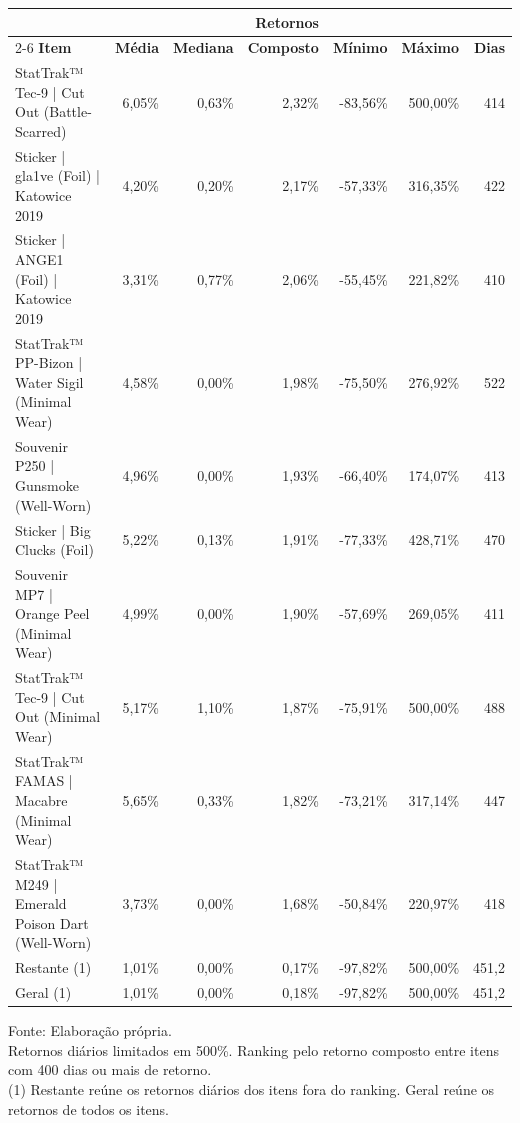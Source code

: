 \begingroup
\setlength{}
\setlength{}
\fontsize{8.0pt}{9.6pt}\selectfont

\setlength{\LTpost}{0mm}
\begin{longtable}{@{\extracolsep{\fill}}lrrrrrr}

\toprule
 & \multicolumn{5}{c}{\textbf{Retornos}} &  \\ 
\cmidrule(lr){2-6}
\textbf{Item} & \textbf{Média} & \textbf{Mediana} & \textbf{Composto} & \textbf{Mínimo} & \textbf{Máximo} & \textbf{Dias} \\ 
\midrule\addlinespace[2.5pt]
StatTrak™ Tec-9 | Cut Out (Battle-Scarred) & 6,05\% & 0,63\% & 2,32\% & -83,56\% & 500,00\% & 414 \\
Sticker | gla1ve (Foil) | Katowice 2019 & 4,20\% & 0,20\% & 2,17\% & -57,33\% & 316,35\% & 422 \\
Sticker | ANGE1 (Foil) | Katowice 2019 & 3,31\% & 0,77\% & 2,06\% & -55,45\% & 221,82\% & 410 \\
StatTrak™ PP-Bizon | Water Sigil (Minimal Wear) & 4,58\% & 0,00\% & 1,98\% & -75,50\% & 276,92\% & 522 \\
Souvenir P250 | Gunsmoke (Well-Worn) & 4,96\% & 0,00\% & 1,93\% & -66,40\% & 174,07\% & 413 \\
Sticker | Big Clucks (Foil) & 5,22\% & 0,13\% & 1,91\% & -77,33\% & 428,71\% & 470 \\
Souvenir MP7 | Orange Peel (Minimal Wear) & 4,99\% & 0,00\% & 1,90\% & -57,69\% & 269,05\% & 411 \\
StatTrak™ Tec-9 | Cut Out (Minimal Wear) & 5,17\% & 1,10\% & 1,87\% & -75,91\% & 500,00\% & 488 \\
StatTrak™ FAMAS | Macabre (Minimal Wear) & 5,65\% & 0,33\% & 1,82\% & -73,21\% & 317,14\% & 447 \\
StatTrak™ M249 | Emerald Poison Dart (Well-Worn) & 3,73\% & 0,00\% & 1,68\% & -50,84\% & 220,97\% & 418 \\
Restante (1) & 1,01\% & 0,00\% & 0,17\% & -97,82\% & 500,00\% & 451,2 \\
Geral (1) & 1,01\% & 0,00\% & 0,18\% & -97,82\% & 500,00\% & 451,2 \\
\bottomrule
\end{longtable}
\begin{minipage}{\linewidth}
Fonte: Elaboração própria.\\
Retornos diários limitados em 500\%. Ranking pelo retorno composto entre itens com 400 dias ou mais de retorno.\\
(1) Restante reúne os retornos diários dos itens fora do ranking. Geral reúne os retornos de todos os itens.\\
\end{minipage}
\endgroup
